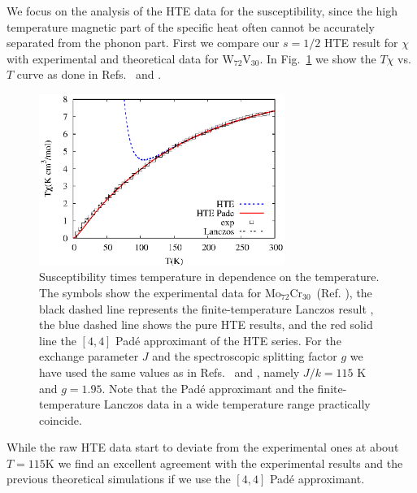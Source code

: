 \documentclass[aps,twocolumn,groupedaddress]{revtex4}
\newcommand {\mocr} {$\textrm{Mo}_{72}\textrm{Cr}_{30}$}
\newcommand {\wv} {$\textrm{W}_{72}\textrm{V}_{30}$}
\begin{document}
We focus on the analysis of the HTE data for the susceptibility, since the
high temperature magnetic part of the specific heat often cannot be
accurately separated from the phonon part.
First we compare our $s=1/2$ HTE result for $\chi$
with experimental \cite{M_W_V30} and theoretical \cite{finite_T_lanc_b}
data for \wv.
In Fig.~\ref{Fe30_compare} we show the $T\chi$ vs. $T$ curve as done in
Refs.~ and .
\begin{figure}
\begin{center}
\includegraphics[clip=on,width=80mm,angle=0]{fig2.eps}
\end{center}
\caption{Susceptibility times temperature in dependence on the temperature.
The symbols show the experimental data for \mocr\ (Ref.
), the black dashed line
represents the finite-temperature Lanczos result \cite{finite_T_lanc_b},
the blue dashed line shows the pure HTE results, and the
red solid line the $[4,4]$ Pad\'e approximant of the HTE series.
For the exchange parameter $J$ and the spectroscopic splitting factor $g$ we
have used the same values as in Refs.~ and
, namely  $J/k=115$ K and $g=1.95$.
Note that  the Pad\'e approximant and the finite-temperature Lanczos data in
a wide temperature range practically coincide.}
\label{Fe30_compare}
\end{figure}
While the raw HTE data start to deviate from the experimental ones at about
$T=115 $K
 we find an excellent agreement with the experimental results and
the previous theoretical simulations  if we use the $[4,4]$ Pad\'e
approximant.
\end{document}
